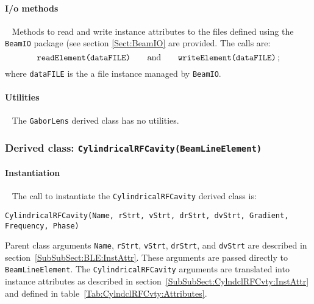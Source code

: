\paragraph{I/o methods} ~\newline
\noindent
Methods to read and write instance attributes to the files defined
using the \texttt{BeamIO} package (see section \ref{Sect:BeamIO} are
provided.
The calls are:
\begin{equation}
  \texttt{readElement(dataFILE)} \quad \quad {\rm and }
      \quad \quad \texttt{writeElement(dataFILE)} \,; \nonumber
\end{equation}
where \texttt{dataFILE} is the a file instance managed by \texttt{BeamIO}.

\paragraph{Utilities} ~\newline
\noindent
The \texttt{GaborLens} derived class has no utilities.

\FloatBarrier

\subsubsection{Derived class: \texttt{CylindricalRFCavity(BeamLineElement)}}

\paragraph{Instantiation} ~\newline
\noindent
The call to instantiate the \texttt{CylindricalRFCavity} derived class is:
\begin{center}
  \texttt{CylindricalRFCavity(Name, rStrt, vStrt, drStrt, dvStrt,
          Gradient, Frequency, Phase)}
\end{center}
Parent class arguments \texttt{Name}, \texttt{rStrt}, \texttt{vStrt},
\texttt{drStrt}, and \texttt{dvStrt} are described in
section~\ref{SubSubSect:BLE:InstAttr}.
These arguments are passed directly to \texttt{BeamLineElement}.
The \texttt{CylindricalRFCavity} arguments are translated into instance
attributes as described in section~\ref{SubSubSect:CylndclRFCvty:InstAttr} and
defined in table~\ref{Tab:CylndclRFCvty:Attributes}. 

